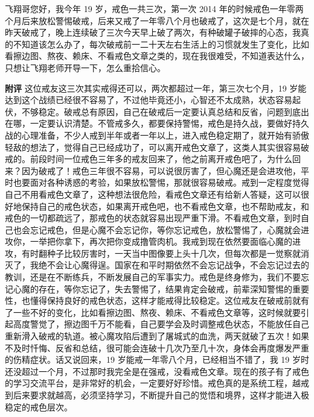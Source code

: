 \begin{case}
    飞翔哥您好，我今年 19 岁，戒色一共三次，第一次 2014 年的时候戒色一年零两个月后来放松警惕破戒，后来又戒了一年零八个月也破戒了，这次是七个月，就在昨天破戒了，晚上连续破了三次今天早上破了两次，有种破罐子破摔的心态，我真的不知道该怎么办了，每次破戒前一二十天左右生活上的习惯就发生了变化，比如看擦边图、熬夜、赖床、不看戒色文章之类的，现在我很难受，不知道表达什么，只想让飞翔老师开导一下，怎么重拾信心。

    \textbf{附评} 这位戒友这三次其实戒得还可以，两次都超过一年，第三次七个月，19 岁能达到这个战绩已经很不容易了，不过他毕竟还小，心智还不太成熟，状态容易起伏，不够稳定。破戒总有原因，自己在破戒后一定要认真总结和反省，问题到底出在哪，一定要认识清楚。不管戒多久，都要保持警惕，戒色是持久战，要做好持久战的心理准备，不少人戒到半年或者一年以上，进入戒色稳定期了，就开始有骄傲轻敌的想法了，觉得自己已经成功了，可以离开戒色文章了，这类人其实很容易破戒的。前段时间一位戒色三年多的戒友回来了，他之前离开戒色吧了，为什么回来？因为破戒了！戒色三年很不容易，可以说很厉害了，但心魔还是会进攻他，平时也要面对各种诱惑的考验，如果放松警惕，那就很容易破戒。戒到一定程度觉得自己不用看戒色文章了，这种想法很危险，看戒色文章还有给新人答疑，这可以很好地保持自己的戒色状态，如果离开戒色吧，也不看戒色文章，也不帮助戒友，和戒色的一切都疏远了，那戒色的状态就容易出现严重下滑。不看戒色文章，到时自己也会忘记戒色，但是心魔不会忘记你，等你忘记戒色，放松警惕了，心魔就会进攻你，一举把你拿下，再次把你变成撸管肉机。我戒到现在依然要面临心魔的进攻，有时翻种子比较厉害时，一天当中图像要上头十几次，但每次都是一觉察就消灭了，我绝不会让心魔得逞。国家在和平时期依然不会忘记战争，不会忘记过去的教训，还是在不断练兵，不断发展自己的军事实力。戒色是终身修为，我们不要忘记心魔的存在，等你忘记了，失去警惕了，结果肯定会破戒，前辈深知警惕的重要性，也懂得保持良好的戒色状态，这样才能戒得比较稳定。这位戒友在破戒前就有了一些不好的变化，比如看擦边图、熬夜、赖床、不看戒色文章等，这时候就要引起高度警觉了，擦边图千万不能看，自己要学会及时调整戒色状态，不能放任自己重新滑入破戒的轨道。被心魔攻陷后遭到了屠城式的血洗，两天就破了五次！如果不及时忏悔、反省和总结，很可能会连破十几次乃至几十次，身体会再度爆发严重的伤精症状。话又说回来，19 岁能戒一年零八个月，已经相当不错了，我 19 岁时还没超过一个月，不过那时我完全是在强戒，没看戒色文章。现在的孩子有了戒色的学习交流平台，是非常好的机会，一定要好好珍惜。戒色真的是系统工程，越戒到后来要求就越高，必须坚持学习，不断提升自己的觉悟和境界，这样才能进入极稳定的戒色层次。
\end{case}

